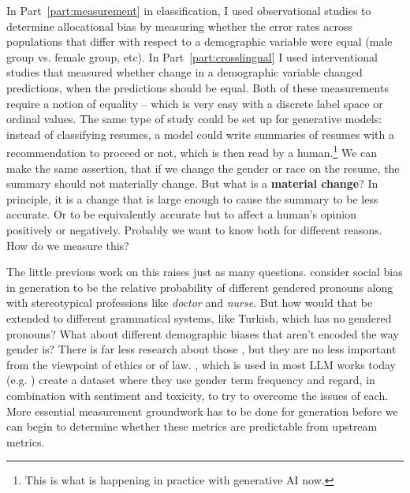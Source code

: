 In Part~\ref{part:measurement} in classification, I used observational studies to determine allocational bias by measuring whether the error rates across populations that differ with respect to a demographic variable were equal (male group vs. female group, etc). In Part~\ref{part:crosslingual} I used interventional studies that measured whether change in a demographic variable changed predictions, when the predictions should be equal. Both of these measurements require a notion of equality -- which is very easy with a discrete label space or ordinal values. The same type of study could be set up for generative models: instead of classifying resumes, a model could write summaries of resumes with a recommendation to proceed or not, which is then read by a human.\footnote{This is what is happening in practice with generative AI now.} We can make the same assertion, that if we change the gender or race on the resume, the summary should not materially change. But what is a \textbf{material change}? In principle, it is a change that is large enough to cause the summary to be less accurate. Or to be equivalently accurate but to affect a human's opinion positively or negatively. Probably we want to know both for different reasons. How do we measure this? 

The little previous work on this raises just as many questions. \citet{vig_causal} consider social bias in generation to be the relative probability of different gendered pronouns along with stereotypical professions like \textit{doctor} and \textit{nurse}. But how would that be extended to different grammatical systems, like Turkish, which has no gendered pronouns? What about different demographic biases that aren't encoded the way gender is? There is far less research about those \citep{}, but they are no less important from the viewpoint of ethics or of law. 
\citet{BOLD}, which is used in most LLM works today (e.g. \citep{llama2,jiang2024mixtral}) create a dataset where they use gender term frequency and regard, in combination with sentiment and toxicity, to try to overcome the issues of each. 
More essential measurement groundwork has to be done for generation before we can begin to determine whether these metrics are predictable from upstream metrics.

